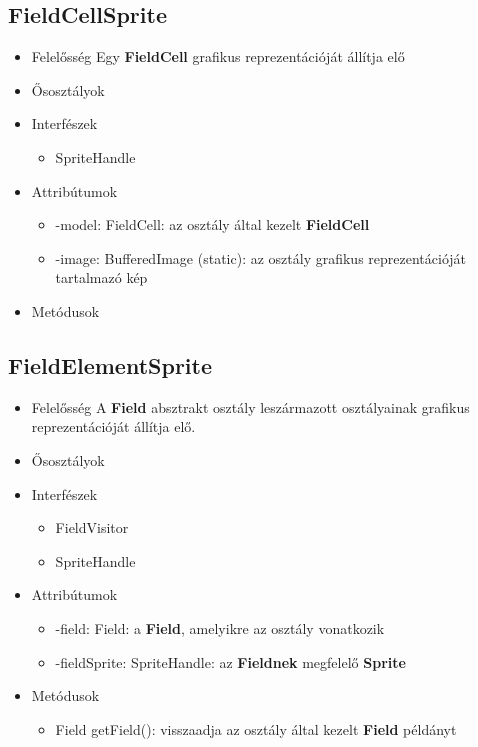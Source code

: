 \subsection{FieldCellSprite}
\begin{itemize}
\item Felelősség \newline
    Egy \textbf{FieldCell} grafikus reprezentációját állítja elő
\item Ősosztályok
\item Interfészek
    \begin{itemize}
        \item SpriteHandle
    \end{itemize}
\item Attribútumok
    \begin{itemize}
        \item -model: FieldCell: az osztály által kezelt \textbf{FieldCell}
        \item -image: BufferedImage (static): az osztály grafikus reprezentációját tartalmazó kép
    \end{itemize}
\item Metódusok
\end{itemize}

\subsection{FieldElementSprite}
\begin{itemize}
\item Felelősség \newline
    A \textbf{Field} absztrakt osztály leszármazott osztályainak grafikus reprezentációját állítja elő.
\item Ősosztályok
\item Interfészek
    \begin{itemize}
        \item FieldVisitor
        \item SpriteHandle
    \end{itemize}
\item Attribútumok
    \begin{itemize}
        \item -field: Field: a \textbf{Field}, amelyikre az osztály vonatkozik
        \item -fieldSprite: SpriteHandle: az \textbf{Fieldnek} megfelelő \textbf{Sprite}
    \end{itemize}
\item Metódusok
	\begin{itemize}
        \item Field getField(): visszaadja az osztály által kezelt \textbf{Field} példányt
	\end{itemize}
\end{itemize}

